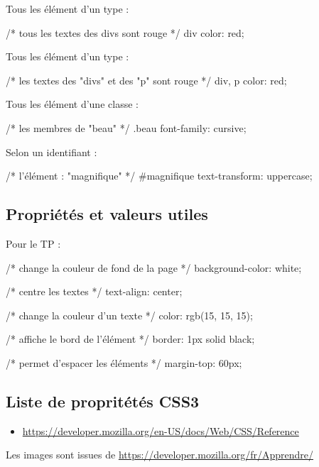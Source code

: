 \documentclass[10pt, landscape, french]{article}
\newenvironment{codeCSS}[1]{%
#1 :  %
\minted{CSS}%
}{%
\endminted%
}
\begin{document}
\begin{multicols*}{3}
\begin{codeCSS}{Tous les élément d'un type}
/* tous les textes des divs sont rouge */
div {color: red;}
\end{codeCSS}

\begin{codeCSS}{Tous les élément d'un type}
/* les textes des "divs" et 
des "p" sont rouge */
div, p { color: red; }
\end{codeCSS}
 
\begin{codeCSS}{Tous les élément d'une classe}
/* les membres de "beau" */
.beau { font-family: cursive; }
\end{codeCSS}

\begin{codeCSS}{Selon un identifiant}
/* l'élément : "magnifique" */
#magnifique { 
  text-transform: uppercase;
}
\end{codeCSS}

\subsection{Propriétés et valeurs utiles}

\begin{codeCSS}{Pour le TP}
/* change la couleur de fond de la page */
 background-color: white;
  
/* centre les textes */
 text-align: center;
  
/* change la couleur d'un texte */
 color: rgb(15, 15, 15);
  
/* affiche le bord de l'élément */
 border: 1px solid black;
  
/* permet d'espacer les éléments */
 margin-top: 60px;


\end{codeCSS}

 
\subsection{Liste de propritétés CSS3} 
\begin{itemize}
	\item \url{https://developer.mozilla.org/en-US/docs/Web/CSS/Reference}
\end{itemize}    

\small {Les images sont issues de \url{https://developer.mozilla.org/fr/Apprendre/}}
    
\end{multicols*}
\end{document}
